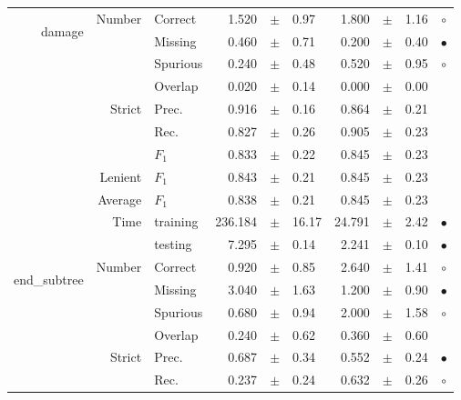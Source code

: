 \begin{longtable}{|r|r|l||rcl|rcl|c|}
\multirow{11}{*}{\begin{sideways}damage\end{sideways} } & \multirow{4}{*}{Number} &  Correct  & 1.520 &  $\pm$  & 0.97 & 1.800 &  $\pm$  & 1.16 &  $\circ$\\
\cline{3-10}
  &  &  Missing  & 0.460 &  $\pm$  & 0.71 & 0.200 &  $\pm$  & 0.40 &  $\bullet$\\
\cline{3-10}
  &  &  Spurious  & 0.240 &  $\pm$  & 0.48 & 0.520 &  $\pm$  & 0.95 &  $\circ$\\
\cline{3-10}
  &  &  Overlap  & 0.020 &  $\pm$  & 0.14 & 0.000 &  $\pm$  & 0.00 &   \\
\cline{2-10}
  & \multirow{3}{*}{Strict} &  Prec.  & 0.916 &  $\pm$  & 0.16 & 0.864 &  $\pm$  & 0.21 &   \\
\cline{3-10}
  &  &  Rec.  & 0.827 &  $\pm$  & 0.26 & 0.905 &  $\pm$  & 0.23 &   \\
\cline{3-10}
  &  &  $F_1$  & 0.833 &  $\pm$  & 0.22 & 0.845 &  $\pm$  & 0.23 &   \\
\cline{2-10}
  & Lenient &  $F_1$  & 0.843 &  $\pm$  & 0.21 & 0.845 &  $\pm$  & 0.23 &   \\
\cline{2-10}
  & Average &  $F_1$  & 0.838 &  $\pm$  & 0.21 & 0.845 &  $\pm$  & 0.23 &   \\
\cline{2-10}
  & \multirow{2}{*}{Time} &  training  & 236.184 &  $\pm$  & 16.17 & 24.791 &  $\pm$  & 2.42 &  $\bullet$\\
\cline{3-10}
  &  &  testing  & 7.295 &  $\pm$  & 0.14 & 2.241 &  $\pm$  & 0.10 &  $\bullet$\\
\hline
\hline
\multirow{11}{*}{\begin{sideways}end\_subtree\end{sideways} } & \multirow{4}{*}{Number} &  Correct  & 0.920 &  $\pm$  & 0.85 & 2.640 &  $\pm$  & 1.41 &  $\circ$\\
\cline{3-10}
  &  &  Missing  & 3.040 &  $\pm$  & 1.63 & 1.200 &  $\pm$  & 0.90 &  $\bullet$\\
\cline{3-10}
  &  &  Spurious  & 0.680 &  $\pm$  & 0.94 & 2.000 &  $\pm$  & 1.58 &  $\circ$\\
\cline{3-10}
  &  &  Overlap  & 0.240 &  $\pm$  & 0.62 & 0.360 &  $\pm$  & 0.60 &   \\
\cline{2-10}
  & \multirow{3}{*}{Strict} &  Prec.  & 0.687 &  $\pm$  & 0.34 & 0.552 &  $\pm$  & 0.24 &  $\bullet$\\
\cline{3-10}
  &  &  Rec.  & 0.237 &  $\pm$  & 0.24 & 0.632 &  $\pm$  & 0.26 &  $\circ$\\

\end{longtable}
